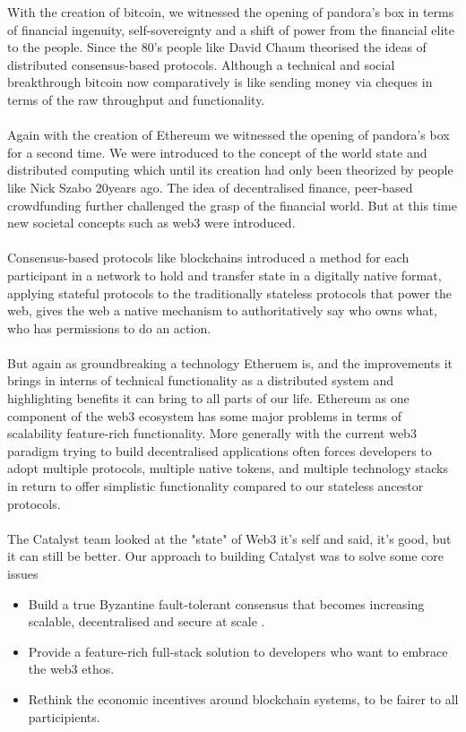 With the creation of bitcoin, we witnessed the opening of pandora's box in terms of financial ingenuity, self-sovereignty and a shift of power from the financial elite to the people. Since the 80's people like David Chaum theorised the ideas of distributed consensus-based protocols. Although a technical and social breakthrough bitcoin now comparatively is like sending money via cheques in terms of the raw throughput and functionality.
\\\\
Again with the creation of Ethereum we witnessed the opening of pandora's box for a second time. We were introduced to the concept of the world state and distributed computing which until its creation had only been theorized by people like Nick Szabo 20years ago. The idea of decentralised finance, peer-based crowdfunding further challenged the grasp of the financial world. But at this time new societal concepts such as web3 were introduced.
\\\\
Consensus-based protocols like blockchains introduced a method for each participant in a network to hold and transfer state in a digitally native format, applying stateful protocols to the traditionally stateless protocols that power the web, gives the web a native mechanism to authoritatively say who owns what, who has permissions to do an action.
\\\\
But again as groundbreaking a technology Etheruem is, and the improvements it brings in interns of technical functionality as a distributed system and highlighting benefits it can bring to all parts of our life. Ethereum as one component of the web3 ecosystem has some major problems in terms of scalability feature-rich functionality. More generally with the current web3 paradigm trying to build decentralised applications often forces developers to adopt multiple protocols, multiple native tokens, and multiple technology stacks in return to offer simplistic functionality compared to our stateless ancestor protocols.
\\\\
The Catalyst team looked at the "state" of Web3 it's self and said, it's good, but it can still be better. 
Our approach to building Catalyst was to solve some core issues

\begin{itemize}
\item Build a true Byzantine fault-tolerant consensus that becomes increasing scalable, decentralised and secure at scale  .
\item Provide a feature-rich full-stack solution to developers who want to embrace the web3 ethos.
\item Rethink the economic incentives around blockchain systems, to be fairer to all participients.
\end{itemize}


